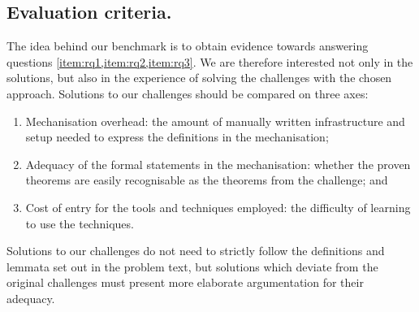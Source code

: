 \documentclass[runningheads]{llncs}
\begin{document}
%




\subsection{Evaluation criteria.}
The idea behind our benchmark is to obtain evidence towards answering
questions \cref{item:rq1,item:rq2,item:rq3}. We are therefore
interested not only in the solutions, but also in the experience of
solving the challenges with the chosen approach.  Solutions to our
challenges should be compared on three axes:
\begin{enumerate}
\item Mechanisation overhead: the amount of manually written infrastructure and setup needed to express the definitions in the mechanisation;
\item Adequacy of the formal statements in the mechanisation: whether the proven theorems are easily recognisable as the theorems from the challenge; and
\item Cost of entry for the tools and techniques employed: the difficulty of learning to use the techniques.
\end{enumerate}
Solutions to our challenges do not need to strictly follow the definitions and lemmata set out in the problem text, but solutions which deviate from the original challenges must present more elaborate argumentation for their adequacy.
\end{document}
